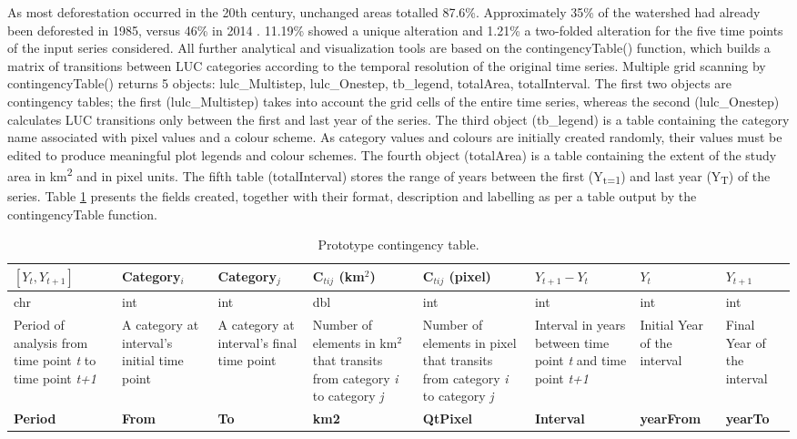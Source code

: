 As most deforestation occurred in the 20th century, unchanged areas
totalled 87.6\%. Approximately 35\% of the watershed had already been
deforested in 1985, versus 46\% in 2014 \citep{Mapbiomas}. 11.19\%
showed a unique alteration and 1.21\% a two-folded alteration for the
five time points of the input series considered. All further analytical
and visualization tools are based on the contingencyTable() function,
which builds a matrix of transitions between LUC categories according to
the temporal resolution of the original time series. Multiple grid
scanning by contingencyTable() returns 5 objects: lulc\_Multistep,
lulc\_Onestep, tb\_legend, totalArea, totalInterval. The first two
objects are contingency tables; the first (lulc\_Multistep) takes into
account the grid cells of the entire time series, whereas the second
(lulc\_Onestep) calculates LUC transitions only between the first and
last year of the series. The third object (tb\_legend) is a table
containing the category name associated with pixel values and a colour
scheme. As category values and colours are initially created randomly,
their values must be edited to produce meaningful plot legends and
colour schemes. The fourth object (totalArea) is a table containing the
extent of the study area in km\textsuperscript{2} and in pixel units.
The fifth table (totalInterval) stores the range of years between the
first (Y\textsubscript{t=1}) and last year (Y\textsubscript{T}) of the
series. Table \ref{tab:prototype} presents the fields created, together
with their format, description and labelling as per a table output by
the contingencyTable function.

\begin{table}[htbp]
\centering
\caption{Prototype contingency table.}
\label{tab:prototype}
\begin{tabular}[t]{>{\centering}p{}<{\small}>{\centering}p{}<{\small}>{\centering}p{}<{\small}>{\small}p{}<{\centering}>{\small}p{}<{\centering}>{\small}p{}<{\centering}>{\small}p{}<{\centering}>{\small}p{}<{\centering}}
\toprule
\([Y_t,Y_{t+1}]\) & Category\(_i\) & Category\(_j\) & C\(_{tij}\) (km\(^2\)) & C\(_{tij}\) (pixel) & \(Y_{t+1} - Y_t\) & \(Y_t\) & \(Y_{t+1}\) \\
\midrule
chr & int & int & dbl & int & int & int & int \\

Period of analysis from time point \textit{t} to time point \textit{t+1} & A category at interval's initial time point & A category at  interval's final time point & Number of elements in km\(^2\) that transits from category \textit{i} to category \textit{j} & Number of elements in pixel that transits from category \textit{i} to category \textit{j} & Interval in years between time point \textit{t} and time point \textit{t+1} & Initial Year of the interval & Final Year of the interval \\
\textbf{Period} & \textbf{From} & \textbf{To} & \textbf{km2} & \textbf{QtPixel} & \textbf{Interval} & \textbf{yearFrom} & \textbf{yearTo} \\
\bottomrule
\end{tabular}
\end{table}

